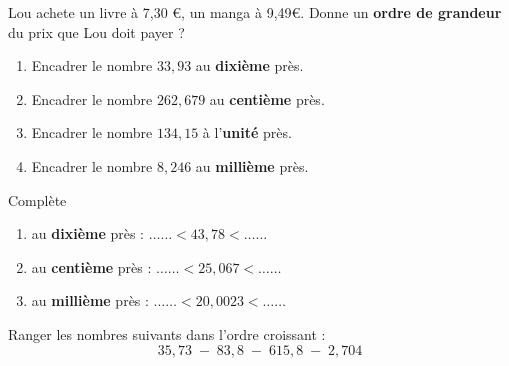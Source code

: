 \begin{pageAD} 



Lou  achete un livre à 7,30 \euro , un manga à 9,49\euro . Donne un \textbf{ordre de grandeur} du prix que Lou doit payer ?
 



\begin{enumerate}
\item Encadrer le nombre $33,93$ au \textbf{dixième} près.
 \item Encadrer le nombre $262,679$ au \textbf{centième} près.
\item Encadrer le nombre $134,15$ à l'\textbf{unité} près.
\item Encadrer le nombre $8,246$ au \textbf{millième} près.
\end{enumerate}




Complète 
\begin{enumerate}
\item au \textbf{dixième} près : $\ldots \ldots < 43,78 < \ldots \ldots $
\item au \textbf{centième} près : $\ldots \ldots < 25,067 < \ldots \ldots $
\item au \textbf{millième} près : $\ldots \ldots < 20,0023 < \ldots \ldots $
\end{enumerate}





Ranger les nombres suivants dans l'ordre croissant : \[35,73\;-\;83,8\;-\;615,8\;-\;2,704\]


\end{pageAD} 



